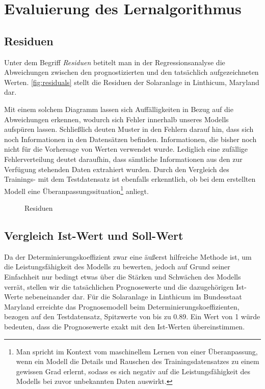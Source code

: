 \documentclass[12pt, a4paper]{article}
\begin{document}
\newpage

\section{Evaluierung des Lernalgorithmus}
\label{sec:evaluation}

\subsection{Residuen}

Unter dem Begriff \textit{Residuen} betitelt man in der Regressionsanalyse die Abweichungen zwischen den prognostizierten und den tatsächlich aufgezeichneten Werten. \autoref{fig:residuals} stellt die Residuen der Solaranlage in Linthicum, Maryland dar. 

Mit einem solchem Diagramm lassen sich Auffälligkeiten in Bezug auf die Abweichungen erkennen, wodurch sich Fehler innerhalb unseres Modells aufspüren lassen. Schließlich deuten Muster in den Fehlern darauf hin, dass sich noch Informationen in den Datensätzen befinden. Informationen, die bisher noch nicht für die Vorhersage von Werten verwendet wurde. Lediglich eine zufällige Fehlerverteilung deutet daraufhin, dass sämtliche Informationen aus den zur Verfügung stehenden Daten extrahiert wurden. Durch den Vergleich des Trainings- mit dem Testdatensatz ist ebenfalls erkenntlich, ob bei dem erstellten Modell eine Überanpassungssituation\footnote{Man spricht im Kontext vom maschinellem Lernen von einer Überanpassung, wenn ein Modell die Details und Rauschen des Trainingsdatensatzes zu einem gewissen Grad erlernt, sodass es sich negativ auf die Leistungsfähigkeit des Modells bei zuvor unbekannten Daten auswirkt.} anliegt.


\begin{figure}
\centering
\def\svgwidth{400pt}

\caption{Residuen }
\label{fig:residuals}
\end {figure}

\subsection{Vergleich Ist-Wert und Soll-Wert}

Da der Determinierungskoeffizient zwar eine äußerst hilfreiche Methode ist, um die Leistungsfähigkeit des Modells zu bewerten, jedoch auf Grund seiner Einfachheit nur bedingt etwas über die Stärken und Schwächen des Modells verrät, stellen wir die tatsächlichen Prognosewerte und die dazugehörigen Ist-Werte nebeneinander dar. Für die Solaranlage in Linthicum im Bundesstaat Maryland erreichte das Prognosemodell beim Determinierungskoeffizienten, bezogen auf den Testdatensatz, Spitzwerte von bis zu 0.89. Ein Wert von 1 würde bedeuten, dass die Prognosewerte exakt mit den Ist-Werten übereinstimmen. 
\end{document}
